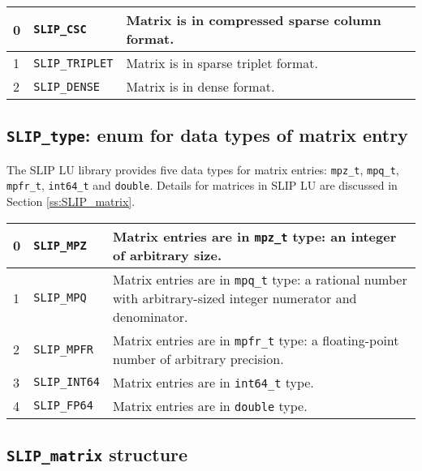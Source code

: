 \documentclass[12pt]{article}
\theoremstyle{definition}
\begin{document}
{\small
\begin{center}
\begin{tabular}{llp{4in}}
\hline
0 & \verb|SLIP_CSC| & Matrix is in compressed sparse column format. \\
\hline
1 & \verb|SLIP_TRIPLET|      & Matrix is in sparse triplet format. \\
\hline
2 & \verb|SLIP_DENSE|        & Matrix is in dense format.\\
\hline
\end{tabular}
\label{tab:SLIP_kind}
\end{center}
}

\cprotect\subsection{\verb|SLIP_type|: enum for data types of matrix entry}
\label{ss:SLIP_type}

The SLIP LU library provides five data types for matrix entries: \verb|mpz_t|,
\verb|mpq_t|, \verb|mpfr_t|, \verb|int64_t| and \verb|double|. Details for
matrices in SLIP LU are discussed in Section \ref{ss:SLIP_matrix}.

{\small
\begin{center}
\begin{tabular}{llp{4in}}
\hline
0 & \verb|SLIP_MPZ|     & Matrix entries are in \verb|mpz_t| type: an integer
                          of arbitrary size. \\
\hline
1 & \verb|SLIP_MPQ|     & Matrix entries are in \verb|mpq_t| type: a rational
                          number with arbitrary-sized integer numerator and
                          denominator. \\
\hline
2 & \verb|SLIP_MPFR|    & Matrix entries are in \verb|mpfr_t| type: a
                          floating-point number of arbitrary precision. \\
\hline
3 & \verb|SLIP_INT64|   & Matrix entries are in \verb|int64_t| type. \\
\hline
4 & \verb|SLIP_FP64|    & Matrix entries are in \verb|double| type. \\
\hline
\end{tabular}
\label{tab:SLIP_type}
\end{center}
}

\cprotect\subsection{\verb|SLIP_matrix| structure}
\end{document}
